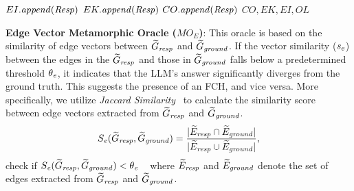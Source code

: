 \begin{algorithm}[!b]
\begin{algorithmic}[1]
            $EI.\mathit{append}(\mathit{Resp})$  
            \State 
            $EK.\mathit{append}(\mathit{Resp})$  
        \Else
            \State
            $CO.\mathit{append}(\mathit{Resp})$
        \EndIf
    \EndIf
    \State \Return $CO, EK, EI, OL$ 
\EndFunction
\end{algorithmic}
\end{algorithm}

\textbf{Edge Vector Metamorphic Oracle ($MO_E$)}: This oracle is based on the similarity of edge vectors between $\widetilde{G}_{\mathit{resp}}$ and $\widetilde{G}_{\mathit{ground}}$. If the vector similarity ($\mathit{s}_{\mathit{e}}$) between the edges in the $\widetilde{G}_{\mathit{resp}}$ and those in $\widetilde{G}_{\mathit{ground}}$ falls below a predetermined threshold $\theta_{\mathit{e}}$, it indicates that the LLM's answer significantly diverges from the ground truth. This suggests the presence of an FCH, and vice versa. %
More specifically, we utilize \emph{Jaccard Similarity}~\cite{J_S} to calculate the similarity score between edge vectors extracted from $\widetilde{G}_{\mathit{resp}}$ and  $\widetilde{G}_{\mathit{ground}}$. 
$$
S_{\mathit{e}}(\widetilde{G}_{\mathit{resp}}, \widetilde{G}_{\mathit{ground}}) = \frac{|\widetilde{E}_{\mathit{resp}} \cap \widetilde{E}_{\mathit{ground}}|}{|\widetilde{E}_{\mathit{resp}} \cup \widetilde{E}_{\mathit{ground}}|}, $$check if $  S_{\mathit{e}}(\widetilde{G}_{\mathit{resp}}, \widetilde{G}_{\mathit{ground}})  < \theta_{\mathit{e}} \ 
$~
where $\widetilde{E}_{\mathit{resp}}$ and $\widetilde{E}_{\mathit{ground}}$ denote the set of edges extracted from $\widetilde{G}_{\mathit{resp}}$ and $\widetilde{G}_{\mathit{ground}}$. 

